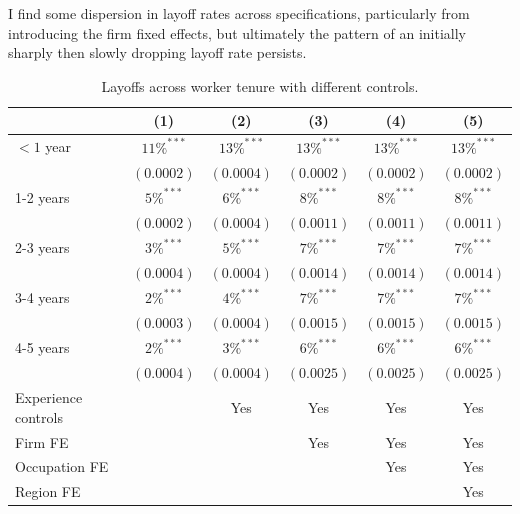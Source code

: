 I find some dispersion in layoff rates across specifications, particularly from introducing the firm fixed effects,  but ultimately the pattern of an initially sharply then slowly dropping layoff rate persists.
\begin{table}[h!]
  \centering
  \begin{tabular}{lccccc}
    \hline
    & (1) & (2) & (3) & (4) & (5)  \\
    \midrule
    \hline
    $<\!1$ year          &  $11\%^{***}$  &  $13\%^{***}$  & $13\%^{***}$    &  $13\%^{***}$      &  $13\%^{***}$     \\  
                         &  $(0.0002)$    &  $(0.0004)$    &  $(0.0002)$     &  $(0.0002)$        & $(0.0002)$        \\
    
    1-2 years            &  $5\%^{***}$  &  $6\%^{***}$    &  $8\%^{***}$    &  $8\%^{***}$       &  $8\%^{***}$      \\  
                         &  $(0.0002)$   &  $(0.0004)$     &  $(0.0011)$     &  $(0.0011)$        & $(0.0011)$        \\

    2-3 years            &  $3\%^{***}$  &  $5\%^{***}$    &  $7\%^{***}$    & $7\%^{***}$        &  $7\%^{***}$      \\  
                         &  $(0.0004)$   &  $(0.0004)$     &  $(0.0014)$     &  $(0.0014)$        & $(0.0014)$        \\
                         
    3-4 years            &  $2\%^{***}$  &  $4\%^{***}$    &  $7\%^{***}$    &  $7\%^{***}$       &  $7\%^{***}$      \\  
                         &  $(0.0003)$   &  $(0.0004)$     &  $(0.0015)$     &  $(0.0015)$        & $(0.0015)$        \\
                         
    4-5 years            &  $2\%^{***}$  &  $3\%^{***}$    &  $6\%^{***}$    &  $6\%^{***}$       &  $6\%^{***}$      \\  
                         &  $(0.0004)$   &  $(0.0004)$     &  $(0.0025)$     &  $(0.0025)$        & $(0.0025)$        \\
    \hline
    \hline
    Experience controls  &                & Yes            & Yes            & Yes            & Yes            \\
    Firm FE              &                &                & Yes            & Yes            & Yes            \\
    Occupation FE        &                &                &                & Yes            & Yes            \\
    Region FE            &                &                &                &                & Yes            \\
    \hline
  \end{tabular}
  \caption{Layoffs across worker tenure with different controls.}
  \label{tab:controls_sep_tenure}
\end{table}

